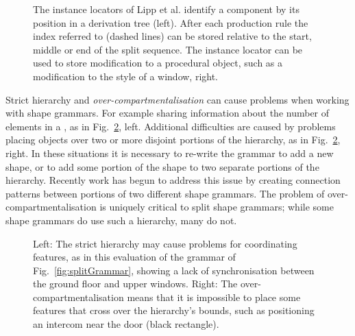 \begin{figure}
\centering
\def\svgwidth{0.6\columnwidth}

\caption[An instance locator]{The instance locators of Lipp et al. \cite{Lipp08} identify a component by its position in a derivation tree (left). After each production rule the index referred to (dashed lines) can be stored relative to the start, middle or end of the split sequence. The instance locator can be used to store modification to a procedural object, such as a modification to the style of a window, right.}
\label{fig:instanceLocator}
\end{figure}


Strict hierarchy and \emph{over-compartmentalisation} can cause problems when working with shape grammars\cite{Hohmann09}. For example sharing information about the number of elements in a \facade{}, as in Fig.~\ref{fig:hierarchyClash}, left. Additional difficulties are caused by problems placing objects over two or more disjoint portions of the hierarchy, as in Fig.~\ref{fig:hierarchyClash}, right.  In these situations it is necessary to re-write the grammar to add a new shape, or to add some portion of the shape to two separate portions of the hierarchy. Recently work has begun to address this issue by creating connection patterns between portions of two different shape grammars\cite{Krecklau11}. 
The problem of over-compartmentalisation is uniquely critical to split shape grammars; while some shape grammars do use such a hierarchy\cite{Stiny78}, many do not\cite{Liu:2005:BCA,Koning81}. 




\begin{figure}
\centering
\def\svgwidth{0.8\columnwidth}

\caption[The over-compartmentalisation problem in shape grammars]{Left: The strict hierarchy may cause problems for coordinating features, as in this evaluation of the grammar of Fig.~\ref{fig:splitGrammar}, showing a lack of synchronisation between the ground floor and upper windows. Right: The over-compartmentalisation means that it is impossible to place some features that cross over the hierarchy's bounds, such as positioning an intercom near the door (black rectangle).}
\label{fig:hierarchyClash}
\end{figure}

